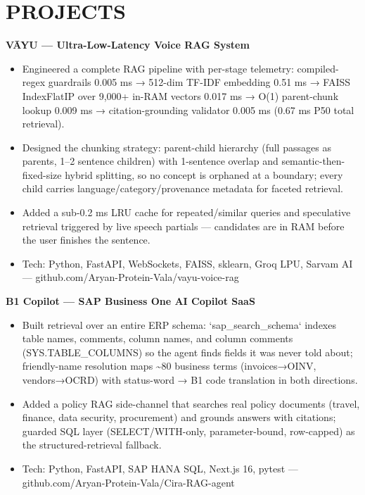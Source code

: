 \documentclass[9pt]{article}
\begin{document}
\section*{PROJECTS}
\textbf{VĀYU  ---  Ultra-Low-Latency Voice RAG System}
\vspace{1pt}
\begin{itemize}[leftmargin=11pt,itemsep=0pt,topsep=1pt,parsep=0pt]
\item Engineered a complete RAG pipeline with per-stage telemetry: compiled-regex guardrails 0.005 ms → 512-dim TF-IDF embedding 0.51 ms → FAISS IndexFlatIP over 9,000+ in-RAM vectors 0.017 ms → O(1) parent-chunk lookup 0.009 ms → citation-grounding validator 0.005 ms (0.67 ms P50 total retrieval).
\item Designed the chunking strategy: parent-child hierarchy (full passages as parents, 1–2 sentence children) with 1-sentence overlap and semantic-then-fixed-size hybrid splitting, so no concept is orphaned at a boundary; every child carries language/category/provenance metadata for faceted retrieval.
\item Added a sub-0.2 ms LRU cache for repeated/similar queries and speculative retrieval triggered by live speech partials  ---  candidates are in RAM before the user finishes the sentence.
\item Tech: Python, FastAPI, WebSockets, FAISS, sklearn, Groq LPU, Sarvam AI  ---  github.com/Aryan-Protein-Vala/vayu-voice-rag
\end{itemize}
\textbf{B1 Copilot  ---  SAP Business One AI Copilot SaaS}
\vspace{1pt}
\begin{itemize}[leftmargin=11pt,itemsep=0pt,topsep=1pt,parsep=0pt]
\item Built retrieval over an entire ERP schema: `sap\_search\_schema` indexes table names, comments, column names, and column comments (SYS.TABLE\_COLUMNS) so the agent finds fields it was never told about; friendly-name resolution maps \textasciitilde{}80 business terms (invoices→OINV, vendors→OCRD) with status-word → B1 code translation in both directions.
\item Added a policy RAG side-channel that searches real policy documents (travel, finance, data security, procurement) and grounds answers with citations; guarded SQL layer (SELECT/WITH-only, parameter-bound, row-capped) as the structured-retrieval fallback.
\item Tech: Python, FastAPI, SAP HANA SQL, Next.js 16, pytest  ---  github.com/Aryan-Protein-Vala/Cira-RAG-agent
\end{itemize}
\end{document}
